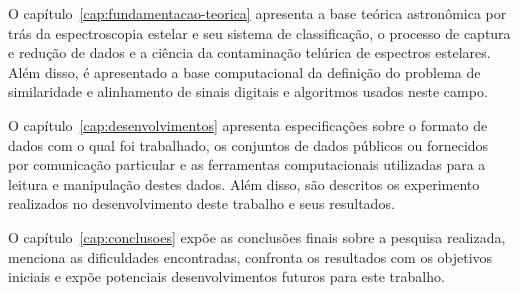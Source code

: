 O capítulo~\ref{cap:fundamentacao-teorica} apresenta a base teórica astronômica por trás da espectroscopia estelar e seu sistema de classificação, o processo de captura e redução de dados e a ciência da contaminação telúrica de espectros estelares. Além disso, é apresentado a base computacional da definição do problema de similaridade e alinhamento de sinais digitais e algoritmos usados neste campo.

O capítulo~\ref{cap:desenvolvimentos} apresenta especificações sobre o formato de dados com o qual foi trabalhado, os conjuntos de dados públicos ou fornecidos por comunicação particular e as ferramentas computacionais utilizadas para a leitura e manipulação destes dados. Além disso, são descritos os experimento realizados no desenvolvimento deste trabalho e seus resultados.

O capítulo~\ref{cap:conclusoes} expõe as conclusões finais sobre a pesquisa realizada, menciona as dificuldades encontradas, confronta os resultados com os objetivos iniciais e expõe potenciais desenvolvimentos futuros para este trabalho.


